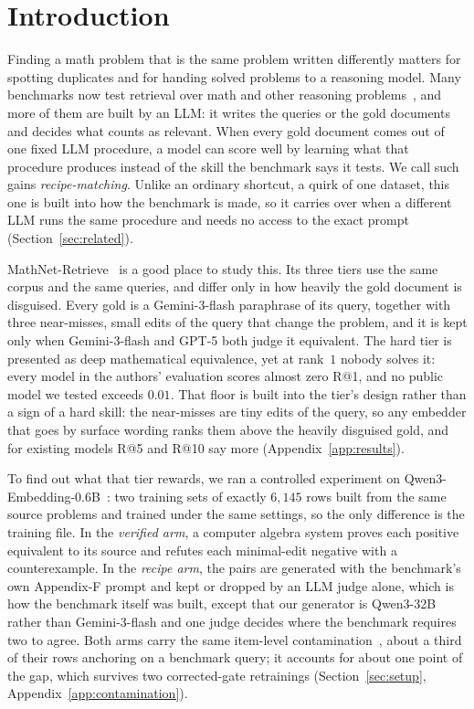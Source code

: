 \section{Introduction}
\label{sec:intro}

Finding a math problem that is the same problem written differently matters for spotting duplicates and for handing solved problems to a reasoning model. Many benchmarks now test retrieval over math and other reasoning problems~\citep{su2025bright,alshammari2026mathnet,georgiev2026saber,ye2026meld}, and more of them are built by an LLM: it writes the queries or the gold documents and decides what counts as relevant. When every gold document comes out of one fixed LLM procedure, a model can score well by learning what that procedure produces instead of the skill the benchmark says it tests. We call such gains \emph{recipe-matching}. Unlike an ordinary shortcut, a quirk of one dataset, this one is built into how the benchmark is made, so it carries over when a different LLM runs the same procedure and needs no access to the exact prompt (Section~\ref{sec:related}).

MathNet-Retrieve~\citep{alshammari2026mathnet} is a good place to study this. Its three tiers use the same corpus and the same queries, and differ only in how heavily the gold document is disguised. Every gold is a Gemini-3-flash paraphrase of its query, together with three near-misses, small edits of the query that change the problem, and it is kept only when Gemini-3-flash and GPT-5 both judge it equivalent. The hard tier is presented as deep mathematical equivalence, yet at rank~$1$ nobody solves it: every model in the authors' evaluation scores almost zero R@1, and no public model we tested exceeds $0.01$. That floor is built into the tier's design rather than a sign of a hard skill: the near-misses are tiny edits of the query, so any embedder that goes by surface wording ranks them above the heavily disguised gold, and for existing models R@5 and R@10 say more (Appendix~\ref{app:results}).

To find out what that tier rewards, we ran a controlled experiment on Qwen3-Embedding-0.6B~\citep{qwen3embedding}: two training sets of exactly $6{,}145$ rows built from the same source problems and trained under the same settings, so the only difference is the training file. In the \emph{verified arm}, a computer algebra system proves each positive equivalent to its source and refutes each minimal-edit negative with a counterexample. In the \emph{recipe arm}, the pairs are generated with the benchmark's own Appendix-F prompt and kept or dropped by an LLM judge alone, which is how the benchmark itself was built, except that our generator is Qwen3-32B rather than Gemini-3-flash and one judge decides where the benchmark requires two to agree. Both arms carry the same item-level contamination~\citep{dekoninck2024constat,yao2024crosslingual}, about a third of their rows anchoring on a benchmark query; it accounts for about one point of the gap, which survives two corrected-gate retrainings (Section~\ref{sec:setup}, Appendix~\ref{app:contamination}).

